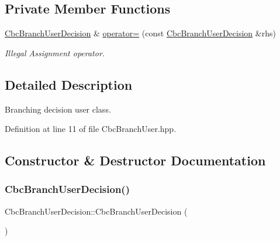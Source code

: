 \subsection*{Private Member Functions}
\begin{DoxyCompactItemize}
\item 
\hyperlink{classCbcBranchUserDecision}{Cbc\+Branch\+User\+Decision} \& \hyperlink{classCbcBranchUserDecision_a404dd442ed444810b03e46fe7e07516b}{operator=} (const \hyperlink{classCbcBranchUserDecision}{Cbc\+Branch\+User\+Decision} \&rhs)
\begin{DoxyCompactList}\small\item\em Illegal Assignment operator. \end{DoxyCompactList}\end{DoxyCompactItemize}


\subsection{Detailed Description}
Branching decision user class. 

Definition at line 11 of file Cbc\+Branch\+User.\+hpp.



\subsection{Constructor \& Destructor Documentation}
\mbox{\label{classCbcBranchUserDecision_a9bee18186d293b3fd2da3e901bf71118}} 
\subsubsection{\texorpdfstring{Cbc\+Branch\+User\+Decision()}{CbcBranchUserDecision()}\hspace{0.1cm}{\footnotesize\ttfamily [1/2]}}
{\footnotesize\ttfamily Cbc\+Branch\+User\+Decision\+::\+Cbc\+Branch\+User\+Decision (\begin{DoxyParamCaption}{ }\end{DoxyParamCaption})}

\mbox{\label{classCbcBranchUserDecision_a8c91b60dbf6b7c963901d316437f9447}} 
